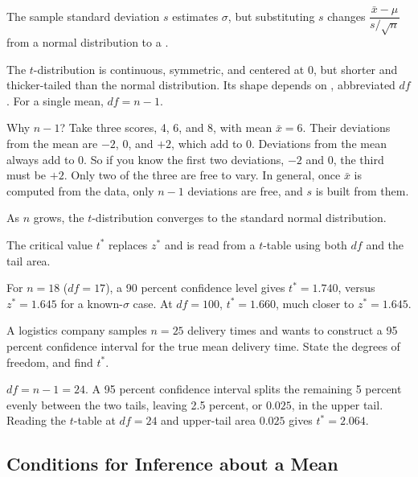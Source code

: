 The sample standard deviation $s$ estimates $\sigma$, but substituting $s$ changes $\dfrac{\bar{x} - \mu}{s / \sqrt{n}}$ from a normal distribution to a .

The $t$-distribution is continuous, symmetric, and centered at 0, but shorter and thicker-tailed than the normal distribution. Its shape depends on , abbreviated $df$. For a single mean, $df = n - 1$.

Why $n - 1$? Take three scores, 4, 6, and 8, with mean $\bar{x} = 6$. Their deviations from the mean are $-2$, $0$, and $+2$, which add to 0. Deviations from the mean always add to 0. So if you know the first two deviations, $-2$ and $0$, the third must be $+2$. Only two of the three are free to vary. In general, once $\bar{x}$ is computed from the data, only $n - 1$ deviations are free, and $s$ is built from them.

As $n$ grows, the $t$-distribution converges to the standard normal distribution.

The critical value $t^*$ replaces $z^*$ and is read from a $t$-table using both $df$ and the tail area.

For $n = 18$ ($df = 17$), a 90 percent confidence level gives $t^* = 1.740$, versus $z^* = 1.645$ for a known-$\sigma$ case. At $df = 100$, $t^* = 1.660$, much closer to $z^* = 1.645$.

\begin{Exercise}[title={Reading the $t$-Table}, label={ex:means-tdist-critical}]
A logistics company samples $n = 25$ delivery times and wants to construct a 95 percent confidence interval for the true mean delivery time. State the degrees of freedom, and find $t^*$.
\end{Exercise}

\begin{Answer}[ref={ex:means-tdist-critical}]
$df = n - 1 = 24$. A 95 percent confidence interval splits the remaining 5 percent evenly between the two tails, leaving 2.5 percent, or $0.025$, in the upper tail. Reading the $t$-table at $df = 24$ and upper-tail area $0.025$ gives $t^* = 2.064$.
\end{Answer}

\subsection{Conditions for Inference about a Mean}

